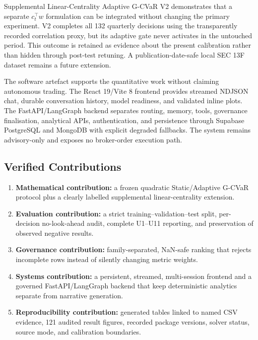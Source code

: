 \documentclass[11pt]{article}
\begin{document}
Supplemental Linear-Centrality Adaptive G-CVaR V2 demonstrates that a separate $c_t^{\top}w$ formulation can be integrated without changing the primary experiment. V2 completes all 132 quarterly decisions using the transparently recorded correlation proxy, but its adaptive gate never activates in the untouched period. This outcome is retained as evidence about the present calibration rather than hidden through post-test retuning. A publication-date-safe local SEC 13F dataset remains a future extension.

The software artefact supports the quantitative work without claiming autonomous trading. The React 19/Vite 8 frontend provides streamed NDJSON chat, durable conversation history, model readiness, and validated inline plots. The FastAPI/LangGraph backend separates routing, memory, tools, governance finalisation, analytical APIs, authentication, and persistence through Supabase PostgreSQL and MongoDB with explicit degraded fallbacks. The system remains advisory-only and exposes no broker-order execution path.

\subsection{Verified Contributions}

\begin{enumerate}
  \item \textbf{Mathematical contribution:} a frozen quadratic Static/Adaptive G-CVaR protocol plus a clearly labelled supplemental linear-centrality extension.
  \item \textbf{Evaluation contribution:} a strict training--validation--test split, per-decision no-look-ahead audit, complete U1--U11 reporting, and preservation of observed negative results.
  \item \textbf{Governance contribution:} family-separated, NaN-safe ranking that rejects incomplete rows instead of silently changing metric weights.
  \item \textbf{Systems contribution:} a persistent, streamed, multi-session frontend and a governed FastAPI/LangGraph backend that keep deterministic analytics separate from narrative generation.
  \item \textbf{Reproducibility contribution:} generated tables linked to named CSV evidence, 121 audited result figures, recorded package versions, solver status, source mode, and calibration boundaries.
\end{enumerate}
\end{document}
